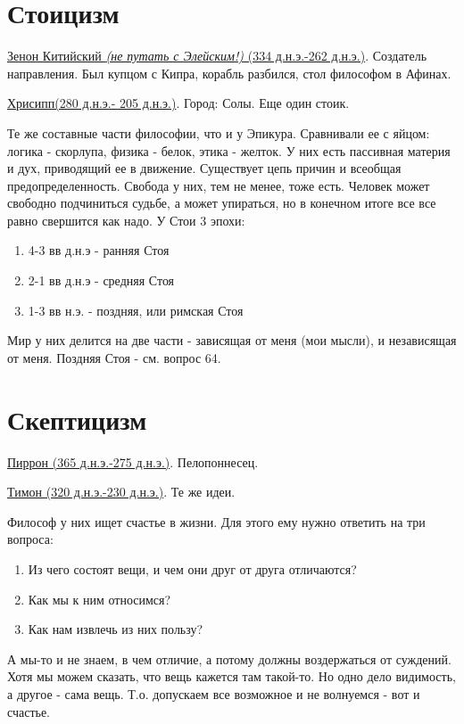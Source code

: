 \documentclass[12pt,a4paper]{article}
\begin{document}
\section{Стоицизм}
\hspace{8pt} 
\underline{Зенон Китийский \textit{(не путать с Элейским!)} (334 д.н.э.-262 д.н.э.)}. Создатель направления. Был купцом с Кипра, корабль разбился, стол философом в Афинах. 

\underline{Хрисипп(280 д.н.э.- 205 д.н.э.)}. Город: Солы. Еще один стоик.

Те же составные части философии, что и у Эпикура. Сравнивали ее с яйцом: логика - скорлупа, физика - белок, этика - желток.
У них есть пассивная материя и дух, приводящий ее в движение. Существует цепь причин и всеобщая предопределенность. Свобода у них, тем не менее, тоже есть. Человек может свободно подчиниться судьбе, а может упираться, но в конечном итоге все все равно свершится как надо. У Стои 3 эпохи:
\begin{enumerate}
\item 4-3 вв д.н.э - ранняя Стоя
\item 2-1 вв д.н.э - средняя Стоя
\item 1-3 вв н.э. - поздняя, или римская Стоя
\end{enumerate}
Мир у них делится на две части - зависящая от меня (мои мысли), и независящая от меня.
Поздняя Стоя - см. вопрос 64.

\section{Скептицизм}
\hspace{8pt} 
\underline{Пиррон (365 д.н.э.-275 д.н.э.)}. Пелопоннесец.

\underline{Тимон (320 д.н.э.-230 д.н.э.)}. Те же идеи.

Философ у них ищет счастье в жизни. Для этого ему нужно ответить на три вопроса:
\begin{enumerate}
\item Из чего состоят вещи, и чем они друг от друга отличаются?
\item Как мы к ним относимся?
\item Как нам извлечь из них пользу?
\end{enumerate}
А мы-то и не знаем, в чем отличие, а потому должны воздержаться от суждений. Хотя мы можем сказать, что вещь кажется там такой-то. Но одно дело видимость, а другое - сама вещь. Т.о. допускаем все возможное и не волнуемся - вот и счастье.
\end{document}
